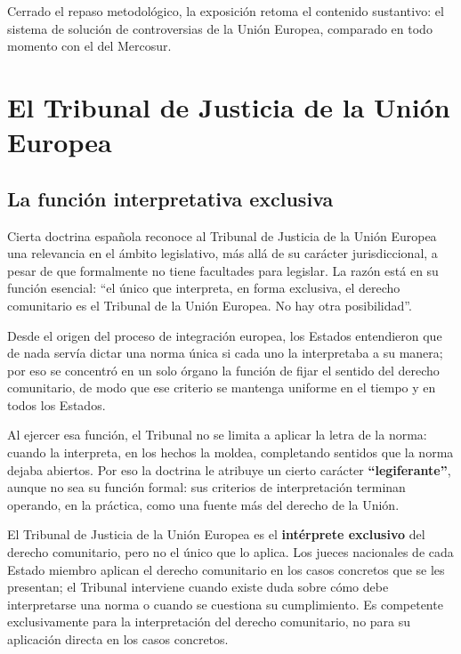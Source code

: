 \documentclass[12pt,oneside]{book}
\begin{document}
Cerrado el repaso metodológico, la exposición retoma el contenido sustantivo: el sistema de solución de controversias de la Unión Europea, comparado en todo momento con el del Mercosur.

\chapter[El Tribunal de Justicia de la Unión Europea]{El Tribunal de Justicia de la Unión Europea}\label{cap:tjue}

\section{La función interpretativa exclusiva}

Cierta doctrina española reconoce al Tribunal de Justicia de la Unión Europea una relevancia en el ámbito legislativo, más allá de su carácter jurisdiccional, a pesar de que formalmente no tiene facultades para legislar. La razón está en su función esencial: “el único que interpreta, en forma exclusiva, el derecho comunitario es el Tribunal de la Unión Europea. No hay otra posibilidad”.

Desde el origen del proceso de integración europea, los Estados entendieron que de nada servía dictar una norma única si cada uno la interpretaba a su manera; por eso se concentró en un solo órgano la función de fijar el sentido del derecho comunitario, de modo que ese criterio se mantenga uniforme en el tiempo y en todos los Estados.

Al ejercer esa función, el Tribunal no se limita a aplicar la letra de la norma: cuando la interpreta, en los hechos la moldea, completando sentidos que la norma dejaba abiertos. Por eso la doctrina le atribuye un cierto carácter \textbf{“legiferante”}, aunque no sea su función formal: sus criterios de interpretación terminan operando, en la práctica, como una fuente más del derecho de la Unión.

\begin{important}
El Tribunal de Justicia de la Unión Europea es el \textbf{intérprete exclusivo} del derecho comunitario, pero no el único que lo aplica. Los jueces nacionales de cada Estado miembro aplican el derecho comunitario en los casos concretos que se les presentan; el Tribunal interviene cuando existe duda sobre cómo debe interpretarse una norma o cuando se cuestiona su cumplimiento. Es competente exclusivamente para la interpretación del derecho comunitario, no para su aplicación directa en los casos concretos.
\end{important}
\end{document}
